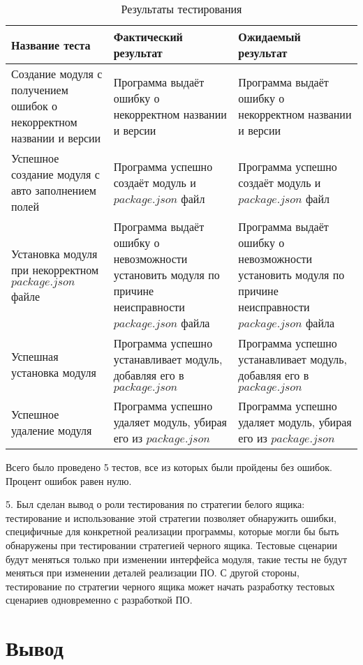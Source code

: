 \documentclass[12pt]{article}
\begin{document}
    \begin{table}[h]
        \centering
        \begin{tabularx}{\textwidth}{m X X}
            \hline
            Название теста & Фактический результат & Ожидаемый результат \\
            \hline
            Создание модуля с получением ошибок о некорректном названии и версии & Программа выдаёт ошибку о некорректном названии и версии & Программа выдаёт ошибку о некорректном названии и версии \\
            \hline
            Успешное создание модуля с авто заполнением полей & Программа успешно создаёт модуль и $package.json$ файл & Программа успешно создаёт модуль и $package.json$ файл \\
            \hline
            Установка модуля при некорректном $package.json$ файле & Программа выдаёт ошибку о невозможности установить модуля по причине неисправности $package.json$ файла & Программа выдаёт ошибку о невозможности установить модуля по причине неисправности $package.json$ файла \\
            \hline
            Успешная установка модуля & Программа успешно устанавливает модуль, добавляя его в $package.json$& Программа успешно устанавливает модуль, добавляя его в $package.json$ \\
            \hline
            Успешное удаление модуля & Программа успешно удаляет модуль, убирая его из $package.json$ & Программа успешно удаляет модуль, убирая его из $package.json$ \\
            \hline
        \end{tabularx}
        \caption{Результаты тестирования}
    \end{table}

    Всего было проведено 5 тестов, все из которых были пройдены без ошибок. Процент ошибок равен нулю.

    5. Был сделан вывод о роли тестирования по стратегии белого ящика: тестирование и использование этой стратегии позволяет обнаружить ошибки, специфичные для конкретной реализации программы, которые могли бы быть обнаружены при тестировании стратегией черного ящика. Тестовые сценарии будут меняться только при изменении интерфейса модуля, такие тесты не будут меняться при изменении деталей реализации ПО. С другой стороны, тестирование по стратегии черного ящика может начать разработку тестовых сценариев одновременно с разработкой ПО.

    \section*{Вывод}
\end{document}
